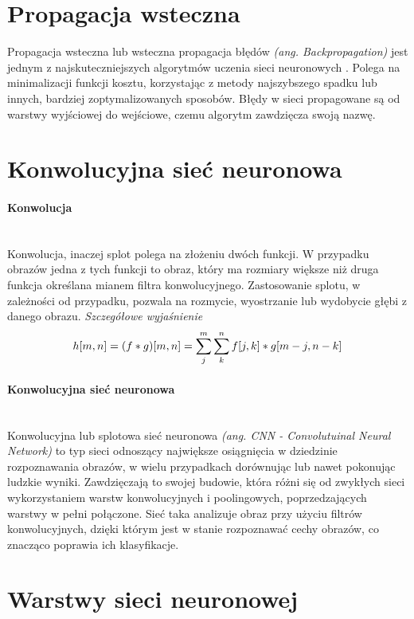 \section{Propagacja wsteczna}
Propagacja wsteczna lub wsteczna propagacja błędów \textit{(ang. Backpropagation)}
jest jednym z najskuteczniejszych algorytmów uczenia sieci neuronowych \cite{CS231n_backprop, backprop}. Polega
na minimalizacji funkcji kosztu, korzystając z metody najszybszego spadku lub
innych, bardziej zoptymalizowanych sposobów. Błędy w sieci propagowane są od warstwy wyjściowej
do wejściowe, czemu algorytm zawdzięcza swoją nazwę.

\section{Konwolucyjna sieć neuronowa}
\paragraph{Konwolucja} \mbox{}\\
Konwolucja, inaczej splot polega na złożeniu dwóch funkcji. W przypadku obrazów
jedna z tych funkcji to obraz, który ma rozmiary większe niż druga funkcja określana
mianem filtra konwolucyjnego. Zastosowanie splotu, w zależności od przypadku,
pozwala na rozmycie, wyostrzanie lub wydobycie głębi z danego obrazu. \textit{Szczegółowe wyjaśnienie} \cite{konwolucja}
\begin{equation}
h[m, n] = (f * g)[m, n] = \sum_j^m \sum_k^n f[j, k] * g[m-j, n-k] \\
\end{equation}

\paragraph{Konwolucyjna sieć neuronowa} \mbox{}\\
Konwolucyjna lub splotowa sieć neuronowa \textit{(ang. CNN - Convolutuinal Neural Network)}
to typ sieci odnoszący największe osiągnięcia w dziedzinie rozpoznawania obrazów,
w wielu przypadkach dorównując lub nawet pokonując ludzkie wyniki. Zawdzięczają to
swojej budowie, która różni się od zwykłych sieci wykorzystaniem warstw konwolucyjnych
i poolingowych, poprzedzających warstwy w pełni połączone. Sieć taka analizuje obraz
przy użyciu filtrów konwolucyjnych, dzięki którym jest w stanie rozpoznawać cechy
obrazów, co znacząco poprawia ich klasyfikacje.

\section{Warstwy sieci neuronowej}
